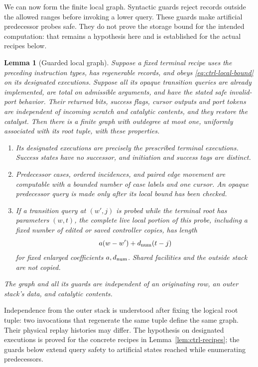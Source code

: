\documentclass[11pt]{article}
\numberwithin{equation}{section}
\newtheorem{lemma}[theorem]{Lemma}
\theoremstyle{definition}
\theoremstyle{remark}
\begin{document}
We can now form the finite local graph. Syntactic guards reject records outside the allowed ranges before invoking a lower query. These guards make artificial predecessor probes safe. They do not prove the storage bound for the intended computation: that remains a hypothesis here and is established for the actual recipes below.

\begin{lemma}[Guarded local graph]\label{lem:ctrl-local-graph}
Suppose a fixed terminal recipe uses the preceding instruction types,
has regenerable records, and obeys
\eqref{eq:ctrl-local-bound} on its designated executions.  Suppose all
its opaque transition queries are already implemented, are total on
admissible arguments, and have the stated safe invalid-port behavior.
Their returned bits, success flags, cursor outputs and port tokens are
independent of incoming scratch and catalytic contents, and they restore
the catalyst.  Then there is a finite graph with outdegree at
most one, uniformly associated with its root tuple, with these
properties.
\begin{enumerate}
\item Its designated executions are precisely the prescribed terminal
  executions.  Success states have no successor, and initiation and
  success tags are distinct.
\item Predecessor cases, ordered incidences, and paired edge movement
  are computable with a bounded number of case labels and one cursor.
  An opaque predecessor query is made only after its local bound has
  been checked.
\item If a transition query at $(w',j)$ is probed while the terminal
  root has parameters $(w,t)$, the complete live local portion of this
  probe, including a fixed number of edited or saved controller copies,
  has length
  \begin{equation}\label{eq:ctrl-neighbor-bound}
  {a}(w-w')+{d_{\rm num}}(t-j)
  \end{equation}
  for fixed enlarged coefficients ${a},{d_{\rm num}}$.  Shared facilities and the
  outside stack are not copied.
\end{enumerate}
The graph and all its guards are independent of an originating row,
an outer stack's data, and catalytic contents.
\end{lemma}

Independence from the outer stack is understood after fixing the logical
root tuple: two invocations that regenerate the same tuple define the
same graph.  Their physical replay histories may differ.  The hypothesis
on designated executions is proved for the concrete recipes in
Lemma~\ref{lem:ctrl-recipes}; the guards below extend query safety to
artificial states reached while enumerating predecessors.
\end{document}
